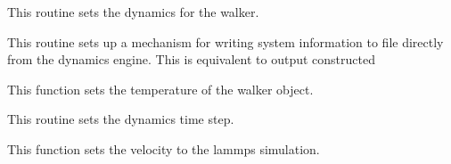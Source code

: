 \documentclass[letterpaper,10pt,english]{sphinxmanual}
\begin{document}
\begin{fulllineitems}
\begin{fulllineitems}
\end{fulllineitems}


\begin{fulllineitems}
\label{walker_api/walker_api.doc:lammpsWalker.lammpsWalker.setDynamics}
This routine sets the dynamics for the walker.

\end{fulllineitems}


\begin{fulllineitems}
\label{walker_api/walker_api.doc:lammpsWalker.lammpsWalker.setOutput}
This routine sets up a mechanism for writing system information to file directly from the dynamics engine. This is equivalent to output constructed

\end{fulllineitems}


\begin{fulllineitems}
\label{walker_api/walker_api.doc:lammpsWalker.lammpsWalker.setTemperature}
This function sets the temperature of the walker object.

\end{fulllineitems}


\begin{fulllineitems}
\label{walker_api/walker_api.doc:lammpsWalker.lammpsWalker.setTimestep}
This routine sets the dynamics time step.

\end{fulllineitems}


\begin{fulllineitems}
\label{walker_api/walker_api.doc:lammpsWalker.lammpsWalker.setVel}
This function sets the velocity to the lammps simulation.

\end{fulllineitems}


\end{fulllineitems}
\end{document}
